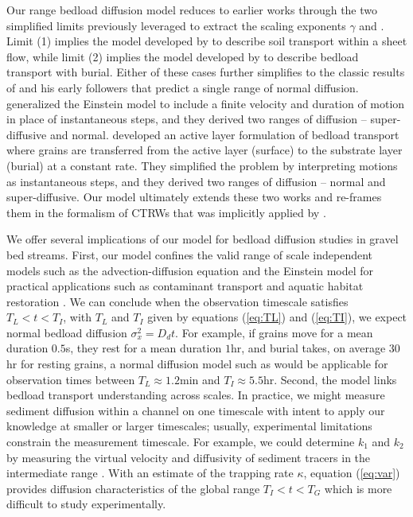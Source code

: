 \documentclass[draft,grl]{agujournal2018}
\begin{document}
Our  range bedload diffusion model reduces to earlier works through the two simplified limits previously leveraged to extract the scaling exponents $\gamma$ and .
Limit (1) implies the model developed by \citet{Lisle1998} to describe soil transport within a sheet flow, while limit (2) implies the model developed by \citet{Wu2019} to describe bedload transport with burial.
Either of these cases further simplifies to the classic results of \citet{Einstein1937} and his early followers \citep[e.g.,][]{Hubbell1964, Nakagawa1976, Yano1969} that predict a single range of normal diffusion.
\citet{Lisle1998} generalized the Einstein model to include a finite velocity and duration of motion in place of instantaneous steps, and they derived two ranges of diffusion -- super-diffusive and normal.
\citet{Wu2019} developed an active layer formulation of bedload transport where grains are transferred from the active layer (surface) to the substrate layer (burial) at a constant rate.
They simplified the problem by interpreting motions as instantaneous steps, and they derived two ranges of diffusion -- normal and super-diffusive.
Our model ultimately extends these two works and re-frames them in the formalism of CTRWs \citep[e.g.,][]{Weiss1994} that was implicitly applied by \citet{Einstein1937}.

We offer several implications of our model for bedload diffusion studies in gravel bed streams.
First, our model confines the valid range of scale independent models such as the advection-diffusion equation \citep[e.g.,][]{Bradley2010} and the Einstein model \citep[e.g.,][]{Martin2012} for practical applications such as contaminant transport \citep[e.g][]{Malmon2005,Macklin2006} and aquatic habitat restoration \citep[e.g.,][]{Gaeuman2017}.
We can conclude when the observation timescale satisfies $T_L<t<T_I$, with $T_L$ and $T_I$ given by equations (\ref{eq:TL}) and (\ref{eq:TI}), we expect normal bedload diffusion $\sigma_x^2 = D_d t$.
For example, if grains move for a mean duration $0.5$s, they rest for a mean duration $1$hr, and burial takes, on average $30$hr for resting grains, a normal diffusion model such as \citet{Einstein1937} would be applicable for observation times between $T_L \approx 1.2$min and $T_I \approx 5.5$hr.
Second, the model links bedload transport understanding across scales. 
In practice, we might measure sediment diffusion within a channel on one timescale with intent to apply our knowledge at smaller or larger timescales; usually, experimental limitations constrain the measurement timescale.
For example, we could determine $k_1$ and $k_2$ by measuring the virtual velocity and diffusivity of sediment tracers in the intermediate range \citep[e.g.,][]{Einstein1937,Yano1969a,Nakagawa1976}.
With an estimate of the trapping rate $\kappa$, equation (\ref{eq:var}) provides diffusion characteristics of the global range $T_I<t<T_G$ which is more difficult to study experimentally.
\end{document}
